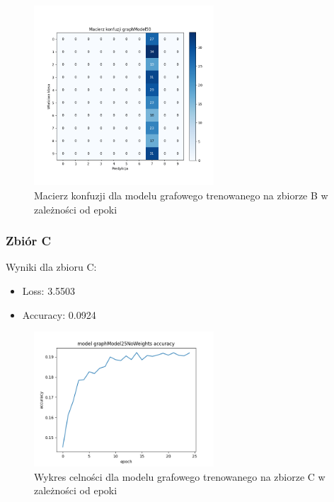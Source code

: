 \documentclass{article}
\begin{document}
\begin{figure}[H]
    \centering
    \includegraphics[width=0.6\textwidth]{../Saves/Graph/graphModel50_confusion.png}
    \caption{Macierz konfuzji dla modelu grafowego trenowanego na zbiorze B w zależności od epoki} 
\end{figure}

\subsubsection{Zbiór C}

Wyniki dla zbioru C:
\begin{itemize}
    \item Loss: 3.5503
    \item Accuracy: 0.0924
\end{itemize}

\begin{figure}[H]
    \centering
    \includegraphics[width=0.6\textwidth]{../Saves/Graph/graphModel25NoWeights_acc.png}
    \caption{Wykres celności dla modelu grafowego trenowanego na zbiorze C w zależności od epoki} 
\end{figure}
\end{document}
